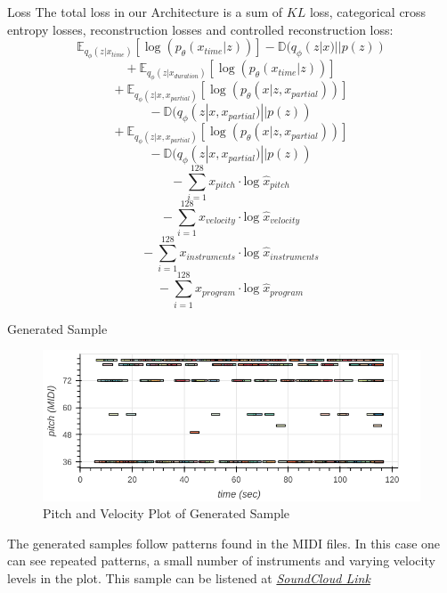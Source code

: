 \documentclass[final]{beamer}
\newlength{\onecolwid}
\newlength{\twocolwid}
\begin{document}
\begin{frame}[t]
\begin{columns}[t]
\begin{column}{\twocolwid}
\begin{columns}[t,totalwidth=\twocolwid]
\begin{column}{\onecolwid}
\begin{block}{Loss}
The total loss in our Architecture is a sum of $KL$ loss, categorical cross entropy losses, reconstruction losses and controlled reconstruction loss:
$$ \mathbb{E}_{q_{\phi}(z|x_{time})} [ \log(p_{\theta}(x_{time}|z))]  - \mathbb{D}(q_{\phi}(z|x) || p(z)) $$
$$ +~\mathbb{E}_{q_{\phi}(z|x_{duration})} [ \log(p_{\theta}(x_{time}|z))] $$
$$ +~\mathbb{E}_{q_{\phi}(z|x,x_{partial})} [ \log(p_{\theta}(x|z, x_{partial}))] $$
$$ -~\mathbb{D}(q_{\phi}(z|x, x_{partial}) || p(z)) $$
$$ +~ \mathbb{E}_{q_{\phi}(z|x,x_{partial})} [ \log(p_{\theta}(x|z, x_{partial}))] $$
$$ -~ \mathbb{D}(q_{\phi}(z|x, x_{partial}) || p(z)) $$
$$ -~\sum_{i=1}^{128} x_{pitch} \cdot \mathrm{log}\; {\hat{x}}_{pitch} $$
$$ -~\sum_{i=1}^{128} x_{velocity} \cdot \mathrm{log}\; {\hat{x}}_{velocity} $$
$$ -~\sum_{i=1}^{128} x_{instruments} \cdot \mathrm{log}\; {\hat{x}}_{instruments} $$
$$ -~\sum_{i=1}^{128} x_{program} \cdot \mathrm{log}\; {\hat{x}}_{program} $$

\end{block}



\begin{alertblock}{Generated Sample}


\begin{figure}
\includegraphics[width=0.9\linewidth]{winter_planet_midi_plot.png}
\caption{Pitch and Velocity Plot of Generated Sample}
\end{figure}

The generated samples follow patterns found in the MIDI files. In this case one can see repeated patterns, a small number of instruments and varying velocity levels in the plot. This sample can be listened at \href{https://soundcloud.com/saravana-r-389436812/cs236-multi-instrument-music-generation-using-vae?si=53eaea6cb734413d80f88bcabc25d3c4}{\textit{SoundCloud Link}}

\end{alertblock} 

\end{column} %


\end{columns}
\end{column}
\end{columns}
\end{frame}
\end{document}
